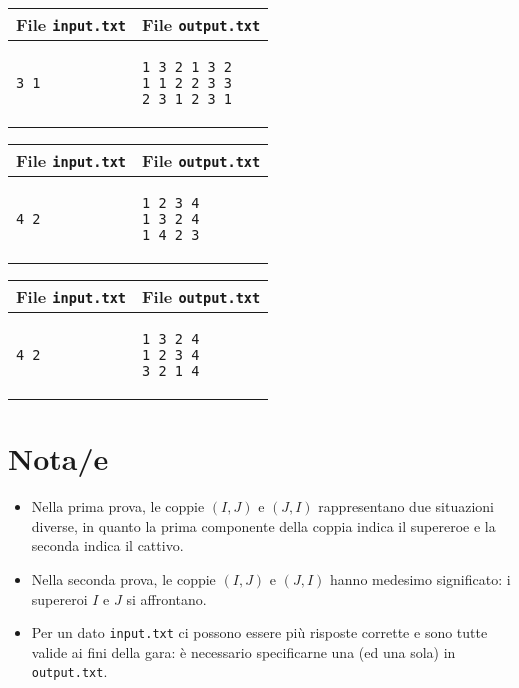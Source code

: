\documentclass[a4paper,11pt]{article}
\begin{document}
    \noindent
    \begin{tabular}{p{11cm}|p{5cm}}
    \toprule
    \textbf{File \texttt{input.txt}}
    & \textbf{File \texttt{output.txt}}
    \\
    \midrule
    \scriptsize
    \begin{verbatim}
3 1
\end{verbatim}
    &
    \scriptsize
    \begin{verbatim}
1 3 2 1 3 2
1 1 2 2 3 3
2 3 1 2 3 1
\end{verbatim}
    \\
    \bottomrule
    \end{tabular}
  
    \noindent
    \begin{tabular}{p{11cm}|p{5cm}}
    \toprule
    \textbf{File \texttt{input.txt}}
    & \textbf{File \texttt{output.txt}}
    \\
    \midrule
    \scriptsize
    \begin{verbatim}
4 2
\end{verbatim}
    &
    \scriptsize
    \begin{verbatim}
1 2 3 4
1 3 2 4
1 4 2 3
\end{verbatim}
    \\
    \bottomrule
    \end{tabular}
  
    \noindent
    \begin{tabular}{p{11cm}|p{5cm}}
    \toprule
    \textbf{File \texttt{input.txt}}
    & \textbf{File \texttt{output.txt}}
    \\
    \midrule
    \scriptsize
    \begin{verbatim}
4 2
\end{verbatim}
    &
    \scriptsize
    \begin{verbatim}
1 3 2 4
1 2 3 4
3 2 1 4
\end{verbatim}
    \\
    \bottomrule
    \end{tabular}
  
\section*{Nota/e}
\begin{itemize}
  
    \item  
Nella prima prova, le coppie $(I,J)$ e $(J,I)$
rappresentano due situazioni diverse, in quanto la prima componente
della coppia indica il supereroe e la seconda indica il cattivo.

    \item 
Nella seconda prova, le coppie $(I,J)$ e $(J,I)$ hanno
medesimo significato: i supereroi $I$ e $J$ si
affrontano.

    \item  
Per un dato \texttt{input.txt} ci possono essere più
risposte corrette e sono tutte valide ai fini della gara: è necessario
specificarne una (ed una sola) in \texttt{output.txt}.

\end{itemize}
\end{document}

